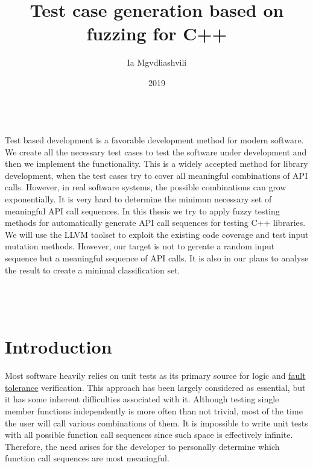 \documentclass{elteikthesis}[2018/06/06]
\date{2019}
\affiliation{Associate Professor}
\author{Ia Mgvdliashvili}
\date{}
\title{Test case generation based on fuzzing for C++}
\begin{document}
\maketitle

\begin{export}
\begin{document} \\
\begin{titlepage}
\end{titlepage}
\end{export}

\vspace*{\fill} \\
Test based development is a favorable development method for modern software. We create all the necessary test cases to test the software under development and then we implement the functionality. This is a widely accepted method for library development, when the test cases try to cover all meaningful combinations of API calls. However, in real software systems, the possible combinations can grow exponentially. It is very hard to determine the minimun necessary set of meaningful API call sequences. In this thesis we try to apply fuzzy testing methods for automatically generate API call sequences for testing C++ libraries. We will use the LLVM toolset to exploit the existing code coverage and test input mutation methods. However, our target is not to gereate a random input sequence but a meaningful sequence of API calls. It is also in our plans to analyse the result to create a minimal classification set. \\

\vspace*{\fill} \\
\cleardoublepage \\
\setcounter{page}{1} \\
\setcounter{tocdepth}{0}
\tableofcontents

\chapter{Introduction}
\label{sec-1}
Most software heavily relies on unit tests as its primary source for logic and \uline{fault tolerance} verification. This approach has been largely considered as essential, but it has some inherent difficulties associated with it. Although testing single member functions independently is more often than not trivial, most of the time the user will call various combinations of them. It is impossible to write unit tests with all possible function call sequences since such space is effectively infinite. Therefore, the need arises for the developer to personally determine which function call sequences are most meaningful. \\
\end{document}
